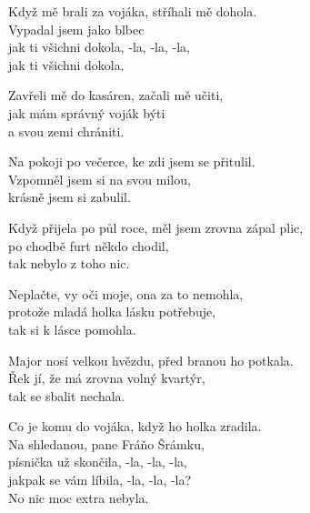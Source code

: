 
\ve{}
Když mě brali za vojáka, stříhali mě dohola.\\
Vypadal jsem jako blbec\\
jak ti všichni dokola,\hspace{1em} -la, \hspace{1em} -la, \hspace{1em} -la,\\
jak ti všichni dokola.

\ve{}
Zavřeli mě do kasáren, začali mě učiti,\\
jak mám správný voják býti\\
a svou zemi chrániti.

\ve{}
Na pokoji po večerce, ke zdi jsem se přitulil.\\
Vzpomněl jsem si na svou milou,\\
krásně jsem si zabulil.

\ve{}
Když přijela po půl roce, měl jsem zrovna zápal plic,\\
po chodbě furt někdo chodil,\\
tak nebylo z toho nic.

\ve{}
Neplačte, vy oči moje, ona za to nemohla,\\
protože mladá holka lásku potřebuje,\\
tak si k lásce pomohla.

\ve{}
Major nosí velkou hvězdu, před branou ho potkala.\\
Řek jí, že má zrovna volný kvartýr,\\
tak se sbalit nechala.

\ve{}
Co je komu do vojáka, když ho holka zradila.\\
Na shledanou, pane Fráňo Šrámku,\\
písnička už skončila, -la, -la, -la,\\
jakpak se vám líbila, -la, -la, -la?\\
No nic moc extra nebyla.

\esong